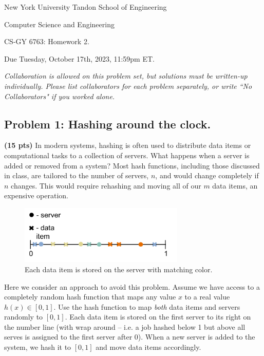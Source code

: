 \documentclass[10pt]{article}
\begin{document}
	
\begin{center}
	\normalsize
	New York University Tandon School of Engineering
	
	Computer Science and Engineering
	\medskip
	
	\large
	CS-GY 6763: Homework 2. 
	
	Due Tuesday, October 17th, 2023, 11:59pm ET.
	\medskip
	
	\normalsize 
	\noindent \emph{Collaboration is allowed on this problem set, but solutions must be written-up individually. Please list collaborators for each problem separately, or write ``No Collaborators" if you worked alone.}

\end{center} 

\subsection{Problem 1: Hashing around the clock.}

\textbf{(15 pts)} In modern systems, hashing is often used to distribute data items or computational tasks to a collection of servers. What happens when a server is added or removed from a system? Most hash functions, including those discussed in class, are tailored to the number of servers, $n$, and would change completely if $n$ changes. This would require rehashing and moving all of our $m$ data items, an expensive operation.

\begin{figure}[h]
	\centering
	\includegraphics[width=0.7\textwidth]{consistentHashing.png}
	\caption{Each data item is stored on the server with matching color.}
\end{figure}


Here we consider an approach to avoid this problem. Assume we have access to a completely random hash function that maps any value $x$ to a real value $h(x) \in [0,1]$. Use the hash function to map \emph{both} data items and servers randomly to $[0,1]$. Each data item is stored on the first server to its right on the number line (with wrap around -- i.e. a job hashed below 1 but above all serves is assigned to the first server after 0). When a new server is added to the system, we hash it to $[0,1]$ and move data items accordingly.
\end{document}
